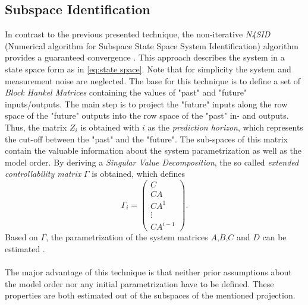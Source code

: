 \documentclass[english]{isasthesis}
\begin{document}
    	\subsection{Subspace Identification} \label{n4sid}
    	In contrast to the previous presented technique, the non-iterative \textit{N4SID} (Numerical algorithm for Subspace State Space System Identification) algorithm provides a guaranteed convergence \cite{van1994n4sid}. This approach describes the system in a state space form as in \eqref{eq:state space}. Note that for simplicity the system and measurement noise are neglected. The base for this technique is to define a set of \textit{Block Hankel Matrices} containing the values of "past" and "future" inputs/outputs. The main step is to project the "future" inputs along the row space of the "future" outputs into the row space of the "past" in- and outputs. Thus, the matrix $Z_i$ is obtained with $i$ as the \textit{prediction horizon}, which represents the cut-off between the "past" and the "future". The sub-spaces of this matrix contain the valuable information about the system parametrization as well as the model order. By deriving a \textit{Singular Value Decomposition}, the so called \textit{extended controllability matrix} $\Gamma$ is obtained, which defines
    	\begin{equation}
    	\Gamma_i = \begin{pmatrix}C \\ CA \\ CA^1 \\ \vdots \\ CA^{i-1}\end{pmatrix}.
    	\end{equation}
    	Based on $\Gamma$, the parametrization of the system matrices $A$,$B$,$C$ and $D$ can be estimated \cite{jamaludin2013n4sid}. \\ \\
    	The major advantage of this technique is that neither prior assumptions about the model order nor any initial parametrization have to be defined. These properties are both estimated out of the subspaces of the mentioned projection.
\end{document}
